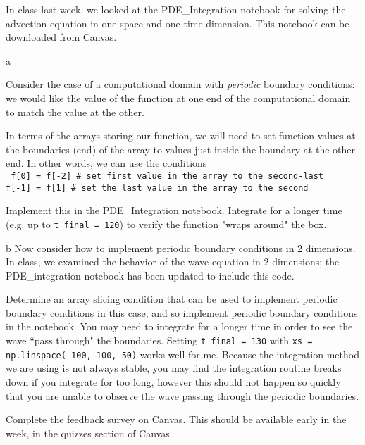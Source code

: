 \documentclass[]{homework}
\begin{document}
\begin{problem}{2}
  In class last week, we looked at the PDE\_Integration notebook for solving the
  advection equation in one space and one time dimension.
  This notebook can be downloaded from Canvas.

  \begin{subproblem}{a}


    Consider the case of a computational domain with
    {\em periodic} boundary conditions: we would like the
    value of the function at one end of the computational
    domain to match the value at the other.

    In terms of the arrays storing our function, we will need to set
    function values at the boundaries (end) of the array to values
    just inside the boundary at the other end. In other words, we can
    use the conditions\\
    \texttt{
f[0] = f[-2] \# set first value in the array to the second-last\\ 
f[-1] = f[1] \# set the last value in the array to the second
    }

    Implement this in the PDE\_Integration notebook. Integrate for a
    longer time (e.g. up to \texttt{t\_final = 120}) to verify the
    function "wraps around" the box.
  \end{subproblem}

  \begin{subproblem}{b}
    Now consider how to implement periodic boundary conditions in
    2 dimensions. In class, we examined the behavior of the wave
    equation in 2 dimensions; the PDE\_integration notebook has been
    updated to include this code.

    Determine an array slicing condition that can be used to
    implement periodic boundary conditions in this case, and
    so implement periodic boundary conditions in the notebook.
    You may need to integrate for a longer time in order to see the
    wave ``pass through" the boundaries. Setting
    \texttt{t\_final = 130} with \texttt{xs = np.linspace(-100, 100, 50)}
    works well for me.
    Because the integration method we are using is not always stable,
    you may find the integration routine breaks down if you integrate for
    too long, however this should not happen so quickly that you are unable
    to observe the wave passing through the periodic boundaries.
  \end{subproblem}

\end{problem}

\begin{problem}{3}
  Complete the feedback survey on Canvas. This should be available
  early in the week, in the quizzes section of Canvas.
\end{problem}
\end{document}
